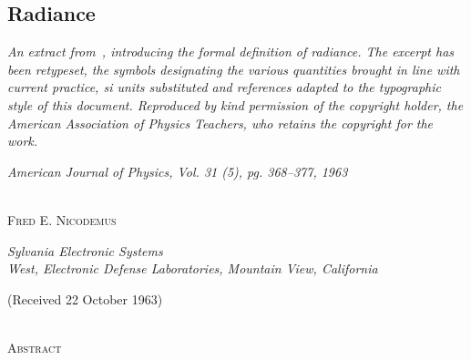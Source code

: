 \begin{refsection}
\chapter{Radiance}
\label{ch:radiance}

\begin{center}
\begin{minipage}{\textwidth - 2em}
\itshape\small
An extract from~\cite{nicodemus63}, introducing the formal definition of
radiance. The excerpt has been retypeset, the symbols designating the various
quantities brought in line with current practice, \gls{si} units substituted and
references adapted to the typographic style of this document.
Reproduced by kind permission of the copyright holder, the American Association of Physics Teachers,
who retains the copyright for the work.
\end{minipage}
\end{center}

\begin{center}
\textit{\Large American Journal of Physics, Vol. 31 (5), pg. 368--377, 1963}

{\Large \adfflourishleftdouble\quad{}\quad\adfflourishrightdouble}\\

\textsc{Fred E. Nicodemus}
\vspace{3pt}

\textit{\small Sylvania Electronic Systems\\
West, Electronic Defense Laboratories, Mountain View, California}

\vspace{3pt}
(Received 22 October 1963)

{\Large \adfclosedflourishleft\quad\adfclosedflourishright}\\

\textsc{Abstract}


\end{center}
\end{refsection}
